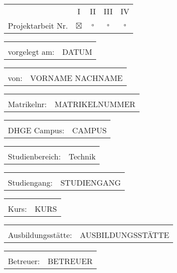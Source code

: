 \maketitle

\begin{tabular}{rcccc}
	     \hspace{5cm} &       I       &     II      &     III     &     IV      \\
	Projektarbeit Nr. & $ \boxtimes $ & $ \square $ & $ \square $ & $ \square $
\end{tabular}

\begin{tabular}{rl}
	 \hspace{5cm} &       \\
	vorgelegt am: & DATUM
\end{tabular}

\begin{tabular}{rl}
	\hspace{5cm} &              \\
	        von: & VORNAME NACHNAME
\end{tabular}

\begin{tabular}{rl}
	\hspace{5cm} &         \\
	 Matrikelnr: & MATRIKELNUMMER
\end{tabular}

\begin{tabular}{rl}
	\hspace{5cm} &      \\
	DHGE Campus: & CAMPUS
\end{tabular}

\begin{tabular}{rl}
	   \hspace{5cm} &         \\
	Studienbereich: & Technik
\end{tabular}

\begin{tabular}{rl}
	\hspace{5cm} &                       \\
	Studiengang: & STUDIENGANG
\end{tabular}

\begin{tabular}{rl}
	\hspace{5cm} &       \\
	       Kurs: & KURS
\end{tabular}

\begin{tabular}{rl}
	      \hspace{5cm} &          \\
	Ausbildungsstätte: & AUSBILDUNGSSTÄTTE
\end{tabular}

\begin{tabular}{rl}
	\hspace{5cm} &          \\
	   Betreuer: & BETREUER
\end{tabular}

\pagebreak
